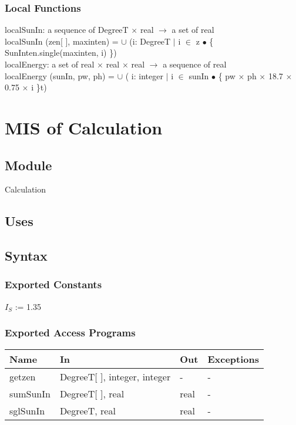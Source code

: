 \documentclass[12pt, titlepage]{article}
\begin{document}
\subsubsection{Local Functions}
localSunIn: a sequence of DegreeT $\times$ real $\rightarrow$ a set of real\\
localSunIn (zen[ ], maxinten) = $\cup$ (i: DegreeT $|$ i $\in$ z $\bullet$ \{ SunInten.single(maxinten, i) \})\\

localEnergy: a set of real $\times$ real $\times$ real $\rightarrow$ a sequence of real\\
localEnergy (sunIn, pw, ph) =  $\cup$ ( i: integer $|$ i $\in$ sunIn $\bullet$ \{ pw $\times$ ph $\times$ 18.7 $\times$ 0.75 $\times$ i \}t)



\newpage


\section{MIS of Calculation} \label{ModuleC} 

\subsection{Module}
Calculation\\


\subsection{Uses}


\subsection{Syntax}

\subsubsection{Exported Constants}
$I_{S}$ := 1.35\\

\subsubsection{Exported Access Programs}

\begin{center}
\begin{tabular}{p{2cm} p{4cm} p{4cm} p{2cm}}
\hline
\textbf{Name} & \textbf{In} & \textbf{Out} & \textbf{Exceptions} \\
\hline
getzen & DegreeT[ ], integer, integer & - & - \\
sumSunIn & DegreeT[ ], real & real & - \\
sglSunIn & DegreeT, real & real & - \\

\hline
\end{tabular}
\end{center}
\end{document}
